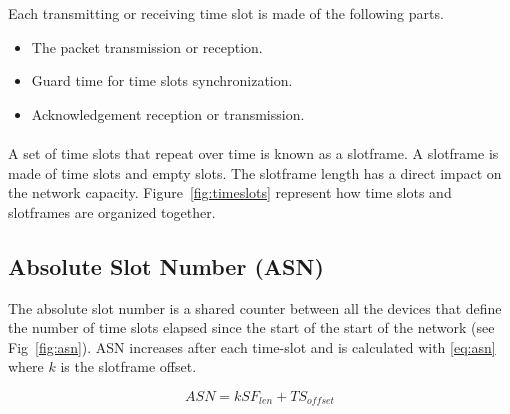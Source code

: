 Each transmitting or receiving time slot is made of the following parts.

\begin{itemize}
  \item The packet transmission or reception.
  \item Guard time for time slots synchronization.
  \item Acknowledgement reception or transmission.
\end{itemize}

\paragraph{}

A set of time slots that repeat over time is known as a slotframe.
A slotframe is made of time slots and empty slots.
The slotframe length has a direct impact on the network capacity.
Figure~\ref{fig:timeslots} represent how time slots and slotframes are
organized together. 



\subsection{Absolute Slot Number (ASN)}

The absolute slot number is a shared counter between all the devices that
define the number of time slots elapsed since the start of the start of the
network (see Fig~\ref{fig:asn}).
ASN increases after each time-slot and is calculated with \ref{eq:asn} where $k$
is the slotframe offset.

\begin{equation}
  \label{eq:asn}
  ASN = k SF_{len} + TS_{offset}
\end{equation}

